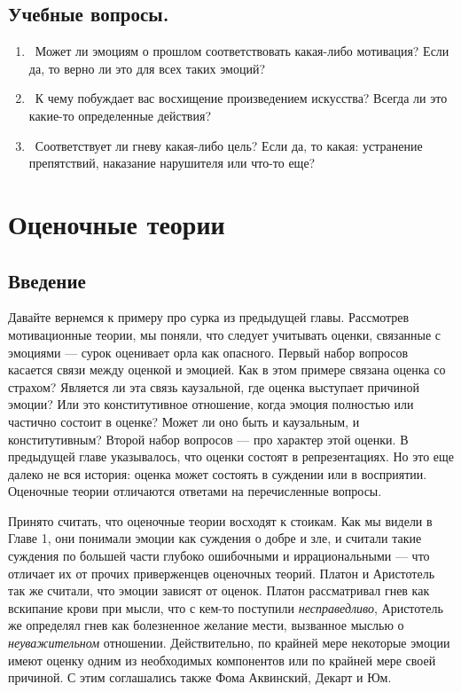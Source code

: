 \documentclass[11pt]{book}
\begin{document}
\begin{tcolorbox}
  \section{Учебные вопросы.}
  \begin{enumerate}
    \item\ Может ли эмоциям о прошлом соответствовать какая-либо мотивация? Если да, то верно ли это для всех таких эмоций?
    \item\ К чему побуждает вас восхищение произведением искусства? Всегда ли это какие-то определенные действия?
    \item\ Соответствует ли гневу какая-либо цель? Если да, то какая: устранение препятствий, наказание нарушителя или что-то еще?
  \end{enumerate}
\end{tcolorbox}

\chapter{Оценочные теории}

\section{Введение}

Давайте вернемся к примеру про сурка из предыдущей главы. Рассмотрев мотивационные теории, мы поняли, что следует учитывать оценки, связанные с эмоциями --- сурок оценивает орла как опасного. Первый набор вопросов касается связи между оценкой и эмоцией. Как в этом примере связана оценка со страхом? Является ли эта связь каузальной, где оценка выступает причиной эмоции? Или это конститутивное отношение, когда эмоция полностью или частично состоит в оценке? Может ли оно быть и каузальным, и конститутивным? Второй набор вопросов --- про характер этой оценки. В предыдущей главе указывалось, что оценки состоят в репрезентациях. Но это еще далеко не вся история: оценка может состоять в суждении или в восприятии. Оценочные теории отличаются ответами на перечисленные вопросы.

Принято считать, что оценочные теории восходят к стоикам. Как мы видели в Главе 1, они понимали эмоции как суждения о добре и зле, и считали такие суждения по большей части глубоко ошибочными и иррациональными --- что отличает их от прочих приверженцев оценочных теорий. Платон и Аристотель так же считали, что эмоции зависят от оценок. Платон рассматривал гнев как вскипание крови при мысли, что с кем-то поступили \textit{несправедливо}, Аристотель же определял гнев как болезненное желание мести, вызванное мыслью о \textit{неуважительном} отношении. Действительно, по крайней мере некоторые эмоции имеют оценку одним из необходимых компонентов или по крайней мере своей причиной. С этим соглашались также Фома Аквинский, Декарт и Юм.
\end{document}
